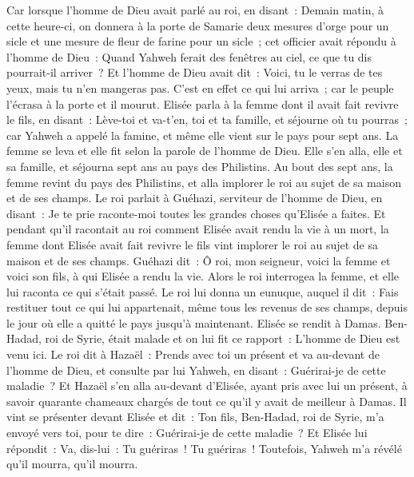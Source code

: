\begin{multicols}{2}
Car lorsque l'homme de Dieu avait parlé au roi, en disant~: Demain matin, à cette heure-ci, on donnera à la porte de Samarie deux mesures d'orge pour un sicle et une mesure de fleur de farine pour un sicle~;
cet officier avait répondu à l'homme de Dieu~: Quand Yahweh ferait des fenêtres au ciel, ce que tu dis pourrait-il arriver~? Et l'homme de Dieu avait dit~: Voici, tu le verras de tes yeux, mais tu n'en mangeras pas.
C'est en effet ce qui lui arriva~; car le peuple l'écrasa à la porte et il mourut.
\VerseOne{}Elisée parla à la femme dont il avait fait revivre le fils, en disant~: Lève-toi et va-t'en, toi et ta famille, et séjourne où tu pourras~; car Yahweh a appelé la famine, et même elle vient sur le pays pour sept ans.
La femme se leva et elle fit selon la parole de l'homme de Dieu. Elle s'en alla, elle et sa famille, et séjourna sept ans au pays des Philistins.
Au bout des sept ans, la femme revint du pays des Philistins, et alla implorer le roi au sujet de sa maison et de ses champs.
Le roi parlait à Guéhazi, serviteur de l'homme de Dieu, en disant~: Je te prie raconte-moi toutes les grandes choses qu'Elisée a faites.
Et pendant qu'il racontait au roi comment Elisée avait rendu la vie à un mort, la femme dont Elisée avait fait revivre le fils vint implorer le roi au sujet de sa maison et de ses champs. Guéhazi dit~: Ô roi, mon seigneur, voici la femme et voici son fils, à qui Elisée a rendu la vie.
Alors le roi interrogea la femme, et elle lui raconta ce qui s'était passé. Le roi lui donna un eunuque, auquel il dit~: Fais restituer tout ce qui lui appartenait, même tous les revenus de ses champs, depuis le jour où elle a quitté le pays jusqu'à maintenant.
Elisée se rendit à Damas. Ben-Hadad, roi de Syrie, était malade et on lui fit ce rapport~: L'homme de Dieu est venu ici.
Le roi dit à Hazaël~: Prends avec toi un présent et va au-devant de l'homme de Dieu, et consulte par lui Yahweh, en disant~: Guérirai-je de cette maladie~?
Et Hazaël s'en alla au-devant d'Elisée, ayant pris avec lui un présent, à savoir quarante chameaux chargés de tout ce qu'il y avait de meilleur à Damas. Il vint se présenter devant Elisée et dit~: Ton fils, Ben-Hadad, roi de Syrie, m'a envoyé vers toi, pour te dire~: Guérirai-je de cette maladie~?
Et Elisée lui répondit~: Va, dis-lui~: Tu guériras~! Tu guériras~! Toutefois, Yahweh m'a révélé qu'il mourra, qu'il mourra.

\end{multicols}
